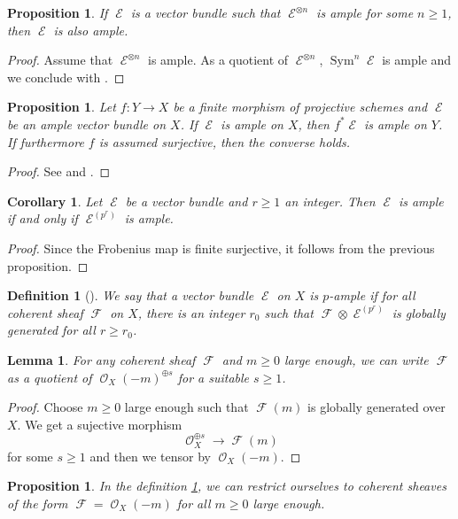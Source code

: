 \documentclass[11pt]{amsart}
\numberwithin{subsection}{section}
\numberwithin{figure}{section}
\numberwithin{table}{section}
\theoremstyle{1}
\newtheorem{lemma}[theorem]{Lemma}
\newtheorem{proposition}[theorem]{Proposition}
\newtheorem{corollary}[theorem]{Corollary}
\newtheorem{definition}[theorem]{Definition}
\theoremstyle{2}
\DeclareMathOperator{\Sym}{Sym}
\DeclareMathOperator{\Fc}{\mathcal{F}}
\DeclareMathOperator{\E}{\mathcal{E}}
\DeclareMathOperator{\Oc}{\mathcal{O}}
\begin{document}
\begin{proposition}\label{squareampclassic}
If $\E$ is a vector bundle such that $\E^{\otimes n}$ is ample for some $n\geq 1$, then $\E$ is also ample.
\end{proposition}
\begin{proof}
Assume that $\E^{\otimes n}$ is ample. As a quotient of $\E^{\otimes n}$, $\Sym^n\E$ is ample and we conclude with \cite[Proposition 2.4]{MR193092}.
\end{proof}
\begin{proposition}\label{prop11}
Let $f : Y \rightarrow X$ be a finite morphism of projective schemes and $\E$ be an ample vector bundle on $X$. If $\E$ is ample on $X$, then $f^*\E$ is ample on $Y$. If furthermore $f$ is assumed surjective, then the converse holds.
\end{proposition}
\begin{proof}
See \cite[Proposition 1.2.9]{MR2095471} and  \cite[Corollary 1.2.24]{MR2095471}.
\end{proof}
\begin{corollary}\label{prop8}
Let $\E$ be a vector bundle and $r\geq 1$ an integer. Then $\E$ is ample if and only if $\E^{(p^r)}$ is ample.
\end{corollary}
\begin{proof}
Since the Frobenius map is finite surjective, it follows from the previous proposition.
\end{proof}
\begin{definition}[\cite{MR193092}]\label{def2}
We say that a vector bundle $\E$ on $X$ is $p$-ample if for all coherent sheaf $\Fc$ on $X$, there is an integer $r_0$ such that $\Fc \otimes \E^{(p^r)}$ is globally generated for all $r \geq r_0$.
\end{definition}
\begin{lemma}\label{lem6}
For any coherent sheaf $\Fc$ and $m \geq 0$ large enough, we can write $\Fc$ as a quotient of $\Oc_X(-m)^{\oplus s}$ for a suitable $s \geq 1$.
\end{lemma}
\begin{proof}
Choose $m \geq 0$ large enough such that $\Fc(m)$ is globally generated over $X$. We get a sujective morphism
\begin{equation*}
\Oc_X^{\oplus s} \rightarrow \Fc(m)
\end{equation*}
for some $s \geq 1$ and then we tensor by $\Oc_X(-m)$.
\end{proof}
\begin{proposition}\label{prop3}
In the definition \ref{def2}, we can restrict ourselves to coherent sheaves of the form $\Fc = \Oc_X(-m)$ for all $m \geq 0$ large enough.
\end{proposition}
\end{document}
